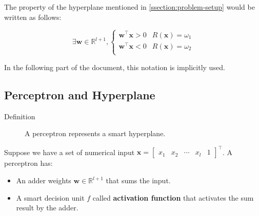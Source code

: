 \documentclass{article}
\begin{document}
The property of the hyperplane  mentioned in 
\ref{ssection:problem-setup} would be written as follows:

\begin{equation}
    \exists \mathbf{w} \in \mathbb{R}^{l+1}, 
    \begin{cases}
        \mathbf{w}^\top \mathbf{x} > 0 & R(\mathbf{x}) = \omega_{1} \\
        \mathbf{w}^\top \mathbf{x} < 0 & R(\mathbf{x}) = \omega_{2} \\
    \end{cases}
\end{equation}

In the following part of the document, this notation is implicitly used.

\clearpage

\subsection{Perceptron and Hyperplane}
\begin{description}
    \item[Definition] A perceptron represents a smart hyperplane. 
\end{description}

Suppose we have a set of numerical input $\mathbf{x}=\begin{bmatrix}
    x_{1} & x_{2} & \cdots & x_{l} & 1
\end{bmatrix}^\top$. A perceptron has:
\begin{itemize}
    \item An adder weights $\mathbf{w} \in \mathbb{R}^{l+1}$ that sums the input.
    \item A smart decision unit $f$ called \textbf{activation function} that activates the sum result by the adder.
\end{itemize}
\end{document}
